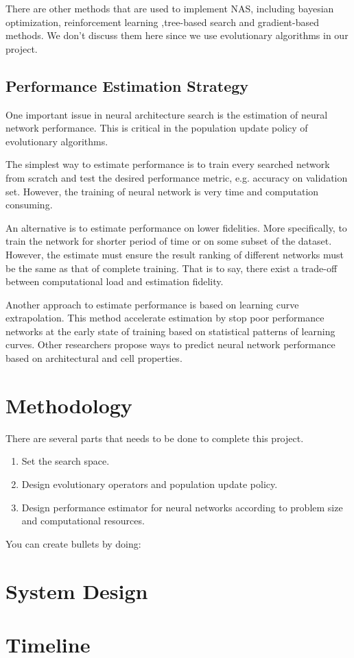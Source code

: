 \documentclass{article}
\begin{document}
\begin{normalsize}
    There are other methods that are used to implement NAS, including bayesian optimization, reinforcement learning ,tree-based search and gradient-based methods. We don't discuss them here since we use evolutionary algorithms in our project.

    \subsection{Performance Estimation Strategy}
    One important issue in neural architecture search is the estimation of neural network performance. This is critical in the population update policy of evolutionary algorithms. 

    The simplest way to estimate performance is to train every searched network from scratch and test the desired performance metric, e.g. accuracy on validation set. However, the training of neural network is very time and computation consuming. 
    
    An alternative is to estimate performance on lower fidelities. More specifically, to train the network for shorter period of time\cite{zoph2018learning} or on some subset of the dataset\cite{klein2016fast}. However, the estimate must ensure the result ranking of different networks must be the same as that of complete training. That is to say, there exist a trade-off between computational load and estimation fidelity.

    Another approach to estimate performance is based on learning curve extrapolation\cite{domhan2015speeding}. This method accelerate estimation by stop poor performance networks at the early state of training based on statistical patterns of learning curves. Other researchers propose ways to predict neural network performance based on architectural and cell properties\cite{liu2018progressive}. 
    \section{Methodology}

    There are several parts that needs to be done to complete this project.
    \begin{enumerate}
      \item Set the search space.
      \item Design evolutionary operators and population update policy.
      \item Design performance estimator for neural networks according to problem size and computational resources.
    \end{enumerate}
      
    
      
    \noindent You can create bullets by doing:

  \section{System Design}
  
  \section{Timeline}
\end{normalsize}
     



\end{document}
